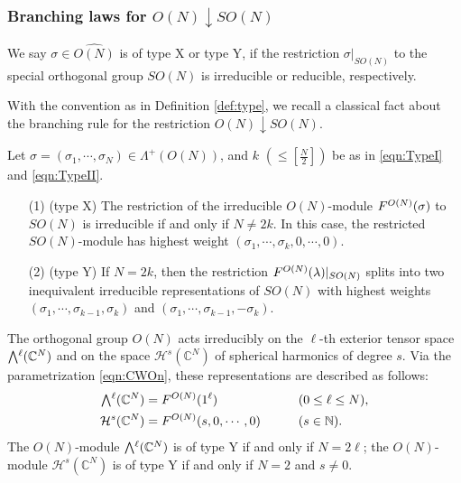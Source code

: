 \subsubsection{Branching laws for $O(N) \downarrow SO(N)$}
\label{subsec:OnSOn}
\begin{definition}
\label{def:OSO}
We say $\sigma \in \widehat{O(N)}$ is of 
type X
 or 
type Y, 
 if the restriction $\sigma|_{SO(N)}$ to the special orthogonal group $SO(N)$ 
 is irreducible
 or reducible, 
 respectively.  
\end{definition}
With the convention as in Definition \ref{def:type},
 we recall a classical fact
 about the branching rule for the restriction
 $O(N) \downarrow SO(N)$. 
\begin{lemma}
[$O(N) \downarrow SO(N)$]
\label{lem:OSO}
Let $\sigma=(\sigma_1, \cdots, \sigma_N) \in \Lambda^+(O(N))$, 
 and $k$ $(\le [\frac N 2])$ be as in \eqref{eqn:TypeI} and \eqref{eqn:TypeII}.  
\begin{enumerate}
\item[{\rm{(1)}}]
{\rm{(type X)}}\enspace
The restriction of the irreducible $O(N)$-module 
 $F^{{O(N)}}({\sigma})$
 to  $SO(N)$ is irreducible if and only if $N \ne2k$. 
In this case, 
the restricted $SO(N)$-module has highest weight
 $(\sigma_1, \cdots, \sigma_k, 0, \cdots, 0)$.  
\item[{\rm{(2)}}]
{\rm{(type Y)}}\enspace
If $N=2k$, 
 then the restriction $F^{{O(N)}}({\lambda})|_{SO(N)}$ splits into two inequivalent 
 irreducible representations
 of $SO(N)$
 with highest weights
 $(\sigma_1, \cdots, \sigma_{k-1}, \sigma_k)$
 and $(\sigma_1, \cdots, \sigma_{k-1}, -\sigma_k)$.  
\end{enumerate}
\end{lemma}



\begin{example}
\label{ex:2.1}
The orthogonal group $O(N)$ acts irreducibly
 on the $\ell$-th exterior tensor space
 $\Exterior^{\ell}({\mathbb{C}}^N)$
 and on the space 
${\mathcal{H}}^s({\mathbb{C}}^N)$
of spherical harmonics of degree $s$.  
Via the parametrization \eqref{eqn:CWOn}, 
 these representations are described as follows:
\begin{alignat*}{2}
\Exterior^\ell ({\mathbb{C}}^N) &= \Kirredrep {O(N)}{1^{\ell}}
\qquad
&&(0\leq \ell \leq N), 
\\
\mathcal{H}^s({\mathbb{C}}^N)&=\Kirredrep {O(N)}{s,0,\cdots,0}
\qquad
&&(s \in {\mathbb{N}}).  
\end{alignat*}
The $O(N)$-module $\Exterior^{\ell}({\mathbb{C}}^N)$ is of type Y
 if and only if $N=2\ell$;
 the $O(N)$-module ${\mathcal{H}}^s({\mathbb{C}}^N)$ is of type Y
 if and only if $N=2$
 and $s\ne 0$.  
\end{example}



